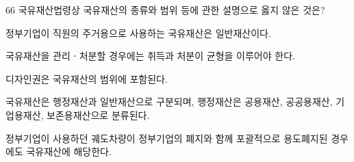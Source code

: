 \begin{question}{66}
국유재산법령상 국유재산의 종류와 범위 등에 관한 설명으로 옳지 않은 것은?
\begin{choices}
  \item 정부기업이 직원의 주거용으로 사용하는 국유재산은 일반재산이다.
  \item 국유재산을 관리ㆍ처분할 경우에는 취득과 처분이 균형을 이루어야 한다.
  \item 디자인권은 국유재산의 범위에 포함된다.
  \item 국유재산은 행정재산과 일반재산으로 구분되며, 행정재산은 공용재산, 공공용재산, 기업용재산, 보존용재산으로 분류된다.
  \item 정부기업이 사용하던 궤도차량이 정부기업의 폐지와 함께 포괄적으로 용도폐지된 경우에도 국유재산에 해당한다.
\end{choices}
\end{question}
